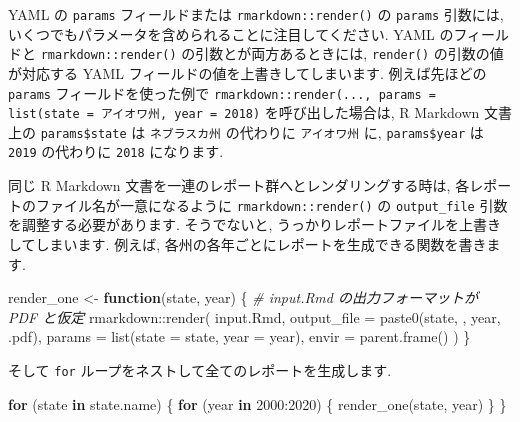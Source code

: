 \documentclass[
  11pt,
  lualatex,ja=standard,jafont=noto]{bxjsreport}
\newenvironment{Shaded}{\begin{snugshade}}{\end{snugshade}}
\newcommand{\AttributeTok}[1]{\textcolor[rgb]{0.77,0.63,0.00}{#1}}
\newcommand{\CommentTok}[1]{\textcolor[rgb]{0.56,0.35,0.01}{\textit{#1}}}
\newcommand{\ControlFlowTok}[1]{\textcolor[rgb]{0.13,0.29,0.53}{\textbf{#1}}}
\newcommand{\DecValTok}[1]{\textcolor[rgb]{0.00,0.00,0.81}{#1}}
\newcommand{\FunctionTok}[1]{\textcolor[rgb]{0.00,0.00,0.00}{#1}}
\newcommand{\NormalTok}[1]{#1}
\newcommand{\OtherTok}[1]{\textcolor[rgb]{0.56,0.35,0.01}{#1}}
\newcommand{\SpecialCharTok}[1]{\textcolor[rgb]{0.00,0.00,0.00}{#1}}
\newcommand{\StringTok}[1]{\textcolor[rgb]{0.31,0.60,0.02}{#1}}
\begin{document}
YAML の \texttt{params} フィールドまたは \texttt{rmarkdown::render()} の \texttt{params} 引数には, いくつでもパラメータを含められることに注目してください. YAML のフィールドと \texttt{rmarkdown::render()} の引数とが両方あるときには, \texttt{render()} の引数の値が対応する YAML フィールドの値を上書きしてしまいます. 例えば先ほどの \texttt{params} フィールドを使った例で \texttt{rmarkdown::render(..., params = list(state = \textquotesingle{}アイオワ州\textquotesingle{},\ year\ =\ 2018)} を呼び出した場合は, R Markdown 文書上の \texttt{params\$state} は \texttt{ネブラスカ州} の代わりに \texttt{アイオワ州} に, \texttt{params\$year} は \texttt{2019} の代わりに \texttt{2018} になります.

同じ R Markdown 文書を一連のレポート群へとレンダリングする時は, 各レポートのファイル名が一意になるように \texttt{rmarkdown::render()} の \texttt{output\_file} 引数を調整する必要があります. そうでないと, うっかりレポートファイルを上書きしてしまいます. 例えば, 各州の各年ごとにレポートを生成できる関数を書きます.

\begin{Shaded}
\begin{Highlighting}[numbers=left,,]
\NormalTok{render\_one }\OtherTok{\textless{}{-}} \ControlFlowTok{function}\NormalTok{(state, year) \{}
  \CommentTok{\# input.Rmd の出力フォーマットが PDF と仮定}
\NormalTok{  rmarkdown}\SpecialCharTok{::}\FunctionTok{render}\NormalTok{(}
    \StringTok{\textquotesingle{}input.Rmd\textquotesingle{}}\NormalTok{,}
    \AttributeTok{output\_file =} \FunctionTok{paste0}\NormalTok{(state, }\StringTok{\textquotesingle{}{-}\textquotesingle{}}\NormalTok{, year, }\StringTok{\textquotesingle{}.pdf\textquotesingle{}}\NormalTok{),}
    \AttributeTok{params =} \FunctionTok{list}\NormalTok{(}\AttributeTok{state =}\NormalTok{ state, }\AttributeTok{year =}\NormalTok{ year),}
    \AttributeTok{envir =} \FunctionTok{parent.frame}\NormalTok{()}
\NormalTok{  )}
\NormalTok{\}}
\end{Highlighting}
\end{Shaded}

そして \texttt{for} ループをネストして全てのレポートを生成します.

\begin{Shaded}
\begin{Highlighting}[numbers=left,,]
\ControlFlowTok{for}\NormalTok{ (state }\ControlFlowTok{in}\NormalTok{ state.name) \{}
  \ControlFlowTok{for}\NormalTok{ (year }\ControlFlowTok{in} \DecValTok{2000}\SpecialCharTok{:}\DecValTok{2020}\NormalTok{) \{}
    \FunctionTok{render\_one}\NormalTok{(state, year)}
\NormalTok{  \}}
\NormalTok{\}}
\end{Highlighting}
\end{Shaded}
\end{document}
